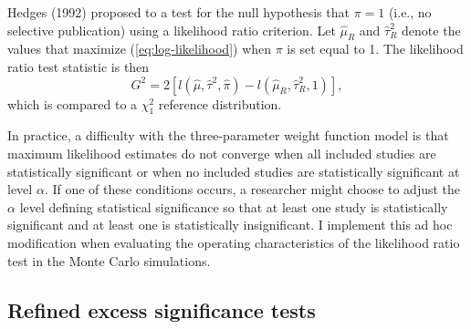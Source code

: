 \documentclass[man,floatsintext]{apa6}
\begin{document}
Hedges (1992) proposed to a test for the null hypothesis that \(\pi = 1\) (i.e., no selective publication) using a likelihood ratio criterion.
Let \(\hat\mu_R\) and \(\hat\tau^2_R\) denote the values that maximize (\ref{eq:log-likelihood}) when \(\pi\) is set equal to 1. The likelihood ratio test statistic is then
\begin{equation}
G^2 = 2 \left[l(\hat\mu, \hat\tau^2, \hat\pi) - l(\hat\mu_R, \hat\tau_R^2, 1)\right],
\label{eq:LRT}
\end{equation}
which is compared to a \(\chi^2_1\) reference distribution.

In practice, a difficulty with the three-parameter weight function model is that maximum likelihood estimates do not converge when all included studies are statistically significant or when no included studies are statistically significant at level \(\alpha\).
If one of these conditions occurs, a researcher might choose to adjust the \(\alpha\) level defining statistical significance so that at least one study is statistically significant and at least one is statistically insignificant.
I implement this ad hoc modification when evaluating the operating characteristics of the likelihood ratio test in the Monte Carlo simulations.

\hypertarget{refined-excess-significance-tests}{%
\subsection{Refined excess significance tests}\label{refined-excess-significance-tests}}
\end{document}
